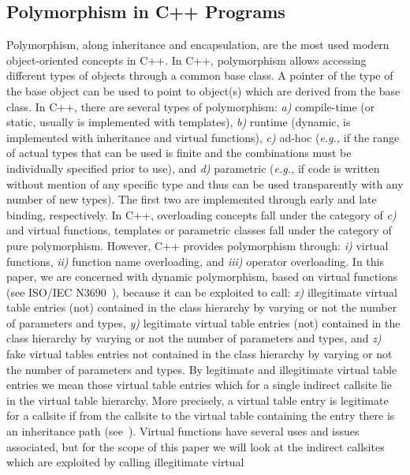 \subsection{Polymorphism in C++ Programs}
\label{Polymorphism in C++}
Polymorphism, along inheritance and encapsulation, are the most used modern object-oriented concepts in C++. In C++, polymorphism allows accessing different types of objects 
through a common base class. A pointer of the type of the base object can be used to point to object(s) which are derived from the base class. In C++, there are 
several types of polymorphism:
\textit{a)} compile-time (or static, usually is implemented with templates), 
\textit{b)} runtime (dynamic, is implemented with inheritance and virtual functions), 
\textit{c)} ad-hoc (\textit{e.g.,} if the range of actual types that can be used is finite and the combinations must be individually specified prior to use), and
\textit{d)} parametric (\textit{e.g.,} if code is written without mention of any specific type and thus can be used transparently with any number of new types). 
The first two are implemented through early and late binding, respectively. In C++, overloading concepts fall under the category of \textit{c)} and virtual functions, 
templates or parametric classes fall under the category of pure polymorphism. However, C++ provides polymorphism through: 
\textit{i)} virtual functions,
\textit{ii)} function name overloading, and 
\textit{iii)} operator overloading. 
In this paper, we are concerned with dynamic polymorphism, based on virtual functions (see ISO/IEC N3690~\cite{iso:iecN3690}), because it can be exploited to call: 
\textit{x)} illegitimate virtual table entries (not) contained in the class hierarchy by varying or not the number of parameters and types,
\textit{y)} legitimate virtual table entries (not) contained in the class hierarchy by varying or not the number of parameters and types, and 
\textit{z)} fake virtual tables entries not contained in the class hierarchy by varying or not the number of parameters and types.
By legitimate and illegitimate virtual table entries we mean those virtual table entries which for a single indirect callsite lie in the virtual table hierarchy. More 
precisely, a virtual table entry is legitimate for a callsite if from the callsite to the virtual table containing the entry there is an inheritance path (see~\cite{haller:shrinkwrap}). 
Virtual functions have several uses and issues associated, but for the scope of this paper we will look at the indirect callsites which are exploited by calling illegitimate virtual 
